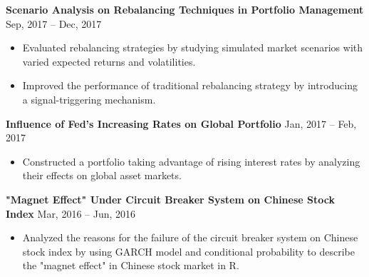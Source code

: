 \documentclass[a4paper,12pt]{report}
\newcommand{\marginAdj}{0.5in}
\begin{document}
\noindent
\textbf{Scenario Analysis on Rebalancing Techniques in Portfolio Management }  \hspace*{\marginAdj}  \hspace*{0.35in} {\fontsize{10pt}{10pt}\selectfont Sep, 2017 – Dec, 2017} \par
\noindent 
\begin{itemize}[noitemsep,topsep=0pt]
	\item {\fontsize{10pt}{10pt}\selectfont Evaluated rebalancing strategies by studying simulated market scenarios with varied expected returns and volatilities.} \par
	\item {\fontsize{10pt}{10pt}\selectfont Improved the performance of traditional rebalancing strategy by introducing a signal-triggering mechanism.} \par
\end{itemize}

\noindent 
\textbf{Influence of Fed's Increasing Rates on Global Portfolio}  \hspace*{\marginAdj}  \hspace*{1.55in} {\fontsize{10pt}{10pt}\selectfont Jan, 2017 – Feb, 2017} \par
\noindent 
\begin{itemize}[noitemsep,topsep=0pt]
\item {\fontsize{10pt}{10pt}\selectfont Constructed a portfolio taking advantage of rising interest rates by analyzing their effects on global asset markets.} \par
\end{itemize}

\noindent 
\textbf{"Magnet Effect" Under Circuit Breaker System on Chinese Stock Index} \hspace*{0.35in}\hspace*{\marginAdj} {\fontsize{10pt}{10pt}\selectfont Mar, 2016 – Jun, 2016} \par
\noindent 
\begin{itemize}[noitemsep,topsep=0pt]
\item {\fontsize{10pt}{10pt}\selectfont Analyzed the reasons for the failure of the circuit breaker system on Chinese stock index by using GARCH model and conditional probability to describe the "magnet effect" in Chinese stock market in R.} \par
\end{itemize}
\end{document}
